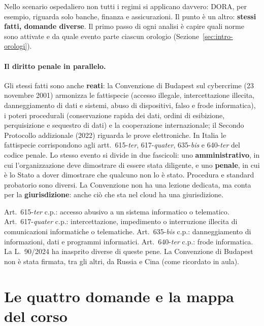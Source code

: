 Nello scenario ospedaliero non tutti i regimi si applicano davvero: DORA, per esempio, riguarda solo
banche, finanza e assicurazioni. Il punto è un altro: \textbf{stessi fatti, domande diverse}. Il primo
passo di ogni analisi è capire quali norme sono attivate e da quale evento parte ciascun orologio
(Sezione~\ref{sec:intro-orologi}).

\paragraph{Il diritto penale in parallelo.} Gli stessi fatti sono anche \textbf{reati}: la Convenzione
di Budapest sul cybercrime (23 novembre 2001) armonizza le fattispecie (accesso illegale,
intercettazione illecita, danneggiamento di dati e sistemi, abuso di dispositivi, falso e frode
informatica), i poteri procedurali (conservazione rapida dei dati, ordini di esibizione, perquisizione
e sequestro di dati) e la cooperazione internazionale; il Secondo Protocollo addizionale (2022)
riguarda le prove elettroniche. In Italia le fattispecie corrispondono agli artt.~615-\emph{ter},
617-\emph{quater}, 635-\emph{bis} e 640-\emph{ter} del codice penale. Lo stesso evento si divide in due
fascicoli: uno \textbf{amministrativo}, in cui l'organizzazione deve dimostrare di essere stata
diligente, e uno \textbf{penale}, in cui è lo Stato a dover dimostrare che qualcuno non lo è stato.
Procedura e standard probatorio sono diversi. La Convenzione non ha una lezione dedicata, ma conta per
la \textbf{giurisdizione}: anche ciò che sta nel cloud ha una giurisdizione.

\begin{integrazione}
Art.~615-\emph{ter} c.p.: accesso abusivo a un sistema informatico o telematico.
Art.~617-\emph{quater} c.p.: intercettazione, impedimento o interruzione illecita di comunicazioni
informatiche o telematiche. Art.~635-\emph{bis} c.p.: danneggiamento di informazioni, dati e programmi
informatici. Art.~640-\emph{ter} c.p.: frode informatica. La L.~90/2024 ha inasprito diverse di queste
pene. La Convenzione di Budapest non è stata firmata, tra gli altri, da Russia e Cina (come ricordato
in aula).
\end{integrazione}

\section{Le quattro domande e la mappa del corso}
\label{sec:intro-domande}

